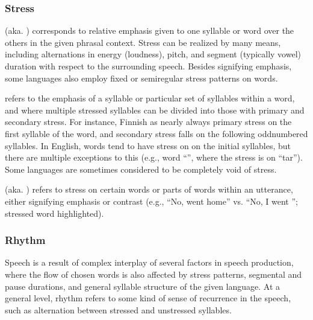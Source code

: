 \documentclass[letterpaper,10pt,english]{jupyterBook}
\begin{document}
\subsubsection{Stress}
\label{\detokenize{Introduction/Linguistic_structure_of_speech:stress}}
\sphinxAtStartPar
{} (aka. ) corresponds to relative emphasis given to one
syllable or word over the others in the given phrasal context. Stress
can be realized by many means, including alternations in energy
(loudness), pitch, and segment (typically vowel) duration with respect
to the surrounding speech. Besides signifying emphasis, some languages
also employ fixed or semi\sphinxhyphen{}regular stress patterns on words.

\sphinxAtStartPar
{} refers to the emphasis of a syllable or particular set of
syllables within a word, and where multiple stressed syllables can be
divided into those with primary and secondary stress. For instance,
Finnish as nearly always primary stress on the first syllable of the
word, and secondary stress falls on the following odd\sphinxhyphen{}numbered
syllables. In English, words tend to have stress on on the initial
syllables, but there are multiple exceptions to this (e.g., word
“”, where the stress is on “\sphinxhyphen{}tar”).  Some languages are
sometimes considered to be completely void of stress.

\sphinxAtStartPar
{} (aka. ) refers to stress on certain
words or parts of words within an utterance, either signifying emphasis
or contrast (e.g., “No,  went home” vs. “No, I went ”;
stressed word highlighted).


\subsubsection{Rhythm}
\label{\detokenize{Introduction/Linguistic_structure_of_speech:rhythm}}
\sphinxAtStartPar
Speech  is a result of complex interplay of several factors in
speech production, where the flow of chosen words is also affected by
stress patterns, segmental and pause durations, and general syllable
structure of the given language. At a general level, rhythm refers to
some kind of sense of recurrence in the speech, such as alternation
between stressed and unstressed syllables.
\end{document}
